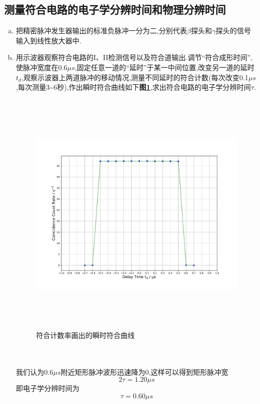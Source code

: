 \documentclass[a4paper]{article}
\begin{document}
\subsection{测量符合电路的电子学分辨时间和物理分辨时间}\label{sub:alu}
\begin{enumerate}[a)]
\item 把精密脉冲发生器输出的标准负脉冲一分为二,分别代表$\beta$探头和$\gamma$探头的信号输入到线性放大器中.
\item 用示波器观察符合电路的I、II检测信号以及符合道输出.调节“符合成形时间”,使脉冲宽度在0.6$\mu s$,固定任意一道的“延时”于某一中间位置,改变另一道的延时$t_d$,观察示波器上两道脉冲的移动情况,测量不同延时的符合计数(每次改变0.1$\mu s$,每次测量3\textasciitilde6秒),作出瞬时符合曲线如下\textbf{图\ref{fig:fig1}},求出符合电路的电子学分辨时间$\tau$.
\begin{figure}[ht]
 \centering
 \includegraphics[height=12cm, width=16cm]{images/phyex1_fig.pdf}
 \caption{符合计数率画出的瞬时符合曲线}
 \label{fig:fig1}
\end{figure}\\\\
我们认为$0.6\mu s$附近矩形脉冲波形迅速降为0,这样可以得到矩形脉冲宽
\begin{equation}
    2\tau=1.20\mu s
\end{equation}
即电子学分辨时间为
\begin{equation}
    \tau=0.60\mu s

\end{equation}
\end{enumerate}
\end{document}
